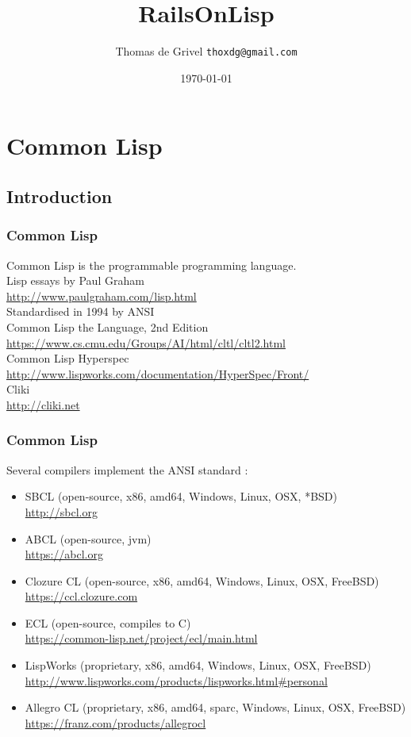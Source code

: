 \documentclass[8pt]{beamer}
\title{RailsOnLisp}
\author{Thomas de Grivel {\tt thoxdg@gmail.com}}
\institute{http://kmx.io}
\date{\today}
\begin{document}
\begin{frame}
\titlepage
\end{frame}

\section{Common Lisp}
\subsection{Introduction}

\begin{frame}
  \frametitle{Common Lisp}
  Common Lisp is the programmable programming language. \\
  \vspace{1em}
  Lisp essays by Paul Graham \\
  \url{http://www.paulgraham.com/lisp.html} \\
  \vspace{1em}
  Standardised in 1994 by ANSI \\
  \vspace{1em}
  Common Lisp the Language, 2nd Edition \\
  \url{https://www.cs.cmu.edu/Groups/AI/html/cltl/cltl2.html} \\
  \vspace{1em}
  Common Lisp Hyperspec \\
  \url{http://www.lispworks.com/documentation/HyperSpec/Front/} \\
  \vspace{1em}
  Cliki \\
  \url{http://cliki.net}
\end{frame}

\begin{frame}
  \frametitle{Common Lisp}
  Several compilers implement the ANSI standard :
  \begin{itemize}
  \item SBCL (open-source, x86, amd64, Windows, Linux, OSX, *BSD) \\
    \url{http://sbcl.org}
  \item ABCL (open-source, jvm) \\
    \url{https://abcl.org}
  \item Clozure CL (open-source, x86, amd64, Windows, Linux, OSX, FreeBSD) \\
    \url{https://ccl.clozure.com}
  \item ECL (open-source, compiles to C) \\
    \url{https://common-lisp.net/project/ecl/main.html}
  \item LispWorks (proprietary, x86, amd64, Windows, Linux, OSX, FreeBSD) \\
    \url{http://www.lispworks.com/products/lispworks.html\#personal}
  \item Allegro CL (proprietary, x86, amd64, sparc, Windows, Linux, OSX, FreeBSD) \\
    \url{https://franz.com/products/allegrocl}
  \end{itemize}
\end{frame}
\end{document}
